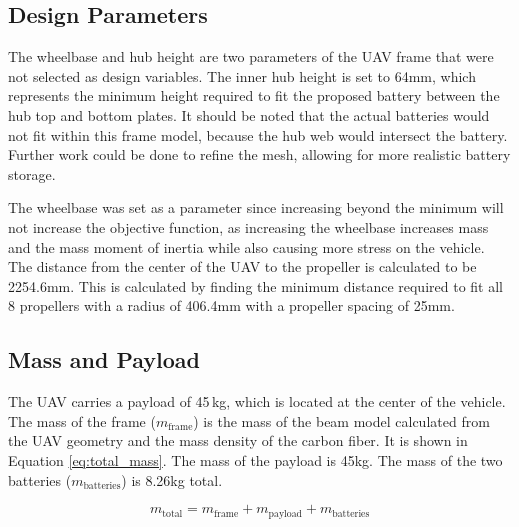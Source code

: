 \documentclass[doublespace,nopageskip]{VTthesis}
\begin{document}
	\subsection{Design Parameters}	\label{ss:des_para}
		
	
		The wheelbase and hub height are two parameters of the UAV frame that were not selected as design variables. The inner hub height is set to 64mm, which represents the minimum height required to fit the proposed battery between the hub top and bottom plates. It should be noted that the actual batteries would not fit within this frame model, because the hub web would intersect the battery. Further work could be done to refine the mesh, allowing for more realistic battery storage. 
		
		The wheelbase was set as a parameter since increasing beyond the minimum will not increase the objective function, as increasing the wheelbase increases mass and the mass moment of inertia while also causing more stress on the vehicle. The distance from the center of the UAV to the propeller is calculated to be 2254.6mm. This is calculated by finding the minimum distance required to fit all 8 propellers with a radius of 406.4mm with a propeller spacing of 25mm. 
	
		
	\subsection{Mass and Payload}	\label{ss:payload}
	
		The UAV carries a payload of 45 kg, which is located at the center of the vehicle. The mass of the frame ($m_{\text{frame}}$) is the mass of the beam model calculated from the UAV geometry and the mass density of the carbon fiber. It is shown in Equation \ref{eq:total_mass}. The mass of the payload is 45kg. The mass of the two batteries ($m_{\text{batteries}}$) is 8.26kg total.
		
		\begin{equation}
			m_{\text{total}} = m_{\text{frame}} + m_{\text{payload}} + m_{\text{batteries}}
			\label{eq:total_mass}
		\end{equation}
		
\end{document}
